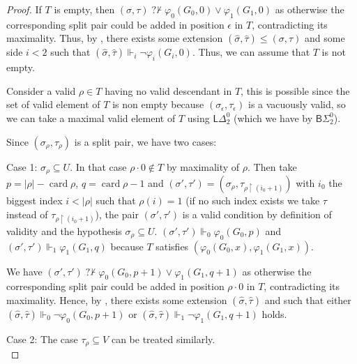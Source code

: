 \documentclass{article}
\numberwithin{theorem}{section}
\newcommand{\nqvdash}{\operatorname{{?}{\nvdash}}}
\newcommand{\BSig}{\mathsf{B}\Sigma^0}
\newcommand{\uh}[0]{{\upharpoonright}}
\newcommand{\card}{\operatorname{card}}
\begin{document}
\begin{proof}
If $T$ is empty, then $(\sigma,\tau) \nqvdash \varphi_0(G_0,0) \vee \varphi_1(G_1,0)$ as otherwise the corresponding split pair could be added in position $\epsilon$ in $T$, contradicting its maximality. Thus, by , there exists some extension $(\hat \sigma, \hat \tau) \leq (\sigma, \tau)$ and some side $i < 2$ such that $(\hat \sigma, \hat \tau) \Vdash_i \neg \varphi_i(G_i,0)$. Thus, we can assume that $T$ is not empty.


Consider a valid $\rho \in T$ having no valid descendant in $T$, this is possible since the set of valid element of $T$ is non empty because $(\sigma_\epsilon, \tau_\epsilon)$ is a vacuously valid, so we can take a maximal valid element of $T$ using $\mathsf{L}\Delta^0_2$ (which we have by $\BSig_2$).

Since $(\sigma_\rho, \tau_\rho)$ is a split pair, we have two cases:

Case 1: $\sigma_{\rho} \subseteq U$. In that case $\rho \cdot 0 \notin T$ by maximality of $\rho$. Then take $p = |\rho| - \card \rho$, $q = \card \rho - 1$ and $(\sigma', \tau') = (\sigma_{\rho}, \tau_{\rho \uh (i_0+1)})$ with $i_0$ the biggest index $i < |\rho|$ such that $\rho(i) = 1$ (if no such index exists we take $\tau$ instead of $\tau_{\rho \uh (i_0+1)}$), the pair $(\sigma', \tau')$ is a valid condition by definition of validity and the hypothesis $\sigma_{\rho} \subseteq U$. $(\sigma', \tau') \Vdash_0 \varphi_0(G_0, p)$ and $(\sigma', \tau') \Vdash_1 \varphi_1(G_1,q)$ because $T$ satisfies $(\varphi_0(G_0, x), \varphi_1(G_1,x))$. 

We have $(\sigma', \tau') \nqvdash \varphi_0(G_0,p + 1) \vee \varphi_1(G_1,q + 1)$ as otherwise the corresponding split pair could be added in position $\rho \cdot 0$ in $T$, contradicting its maximality. Hence, by , there exists some extension $(\hat \sigma, \hat \tau)$ and such that either $(\hat \sigma, \hat \tau) \Vdash_0 \neg \varphi_0(G_0,p + 1)$ or $(\hat \sigma, \hat \tau) \Vdash_1 \neg \varphi_1(G_1,q+1)$ holds.


Case 2: The case $\tau_{\rho} \subseteq V$ can be treated similarly. \\
\end{proof}
\end{document}
